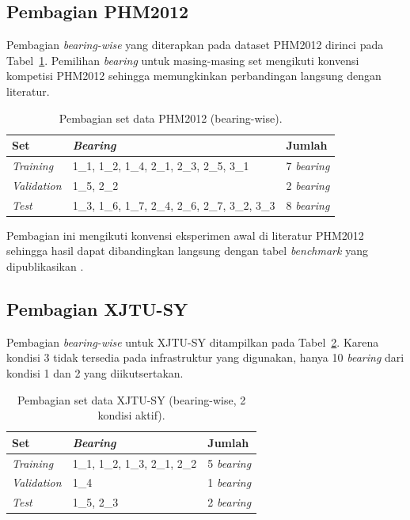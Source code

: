 \subsection{Pembagian PHM2012}
\label{subsec:bab4_split_phm}

Pembagian \emph{bearing-wise} yang diterapkan pada dataset PHM2012 dirinci
pada Tabel~\ref{tab:bab4_split_phm}. Pemilihan \emph{bearing} untuk masing-masing
set mengikuti konvensi kompetisi PHM2012 sehingga memungkinkan perbandingan
langsung dengan literatur.

\begin{table}[ht]
\centering
\caption{Pembagian set data PHM2012 (bearing-wise).}
\label{tab:bab4_split_phm}
\small
\begin{tabular}{@{}lll@{}}
\toprule
\textbf{Set}       & \textbf{\emph{Bearing}}                              & \textbf{Jumlah} \\
\midrule
\emph{Training}    & 1\_1, 1\_2, 1\_4, 2\_1, 2\_3, 2\_5, 3\_1      & 7 \emph{bearing} \\
\emph{Validation}  & 1\_5, 2\_2                                     & 2 \emph{bearing} \\
\emph{Test}        & 1\_3, 1\_6, 1\_7, 2\_4, 2\_6, 2\_7, 3\_2, 3\_3 & 8 \emph{bearing} \\
\bottomrule
\end{tabular}
\end{table}

Pembagian ini mengikuti konvensi eksperimen awal di literatur PHM2012
sehingga hasil dapat dibandingkan langsung dengan tabel \emph{benchmark}
yang dipublikasikan .

\subsection{Pembagian XJTU-SY}
\label{subsec:bab4_split_xjtu}

Pembagian \emph{bearing-wise} untuk XJTU-SY ditampilkan pada
Tabel~\ref{tab:bab4_split_xjtu}. Karena kondisi 3 tidak tersedia
pada infrastruktur yang digunakan, hanya 10 \emph{bearing} dari kondisi 1
dan 2 yang diikutsertakan.

\begin{table}[ht]
\centering
\caption{Pembagian set data XJTU-SY (bearing-wise, 2 kondisi aktif).}
\label{tab:bab4_split_xjtu}
\small
\begin{tabular}{@{}lll@{}}
\toprule
\textbf{Set}       & \textbf{\emph{Bearing}}           & \textbf{Jumlah} \\
\midrule
\emph{Training}    & 1\_1, 1\_2, 1\_3, 2\_1, 2\_2 & 5 \emph{bearing} \\
\emph{Validation}  & 1\_4                          & 1 \emph{bearing} \\
\emph{Test}        & 1\_5, 2\_3                    & 2 \emph{bearing} \\
\bottomrule
\end{tabular}
\end{table}

